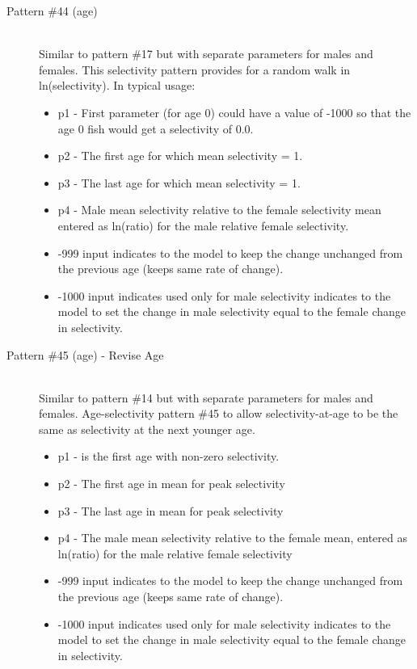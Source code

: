 \begin{description}
	\item[Pattern \#44 (age)]\hfill\\
	Similar to pattern \#17 but with separate parameters for males and females. This selectivity pattern provides for a random walk in ln(selectivity).  In typical usage:
	\begin{itemize}
		\item p1 - First parameter (for age 0) could have a value of -1000 so that the age 0 fish would get a selectivity of 0.0.
		\item p2 - The first age for which mean selectivity = 1.
		\item p3 - The last age for which mean selectivity = 1.
		\item p4 - Male mean selectivity relative to the female selectivity mean entered as ln(ratio) for the male relative female selectivity.
		\item -999 input indicates to the model to keep the change unchanged from the previous age (keeps same rate of change).
		\item -1000 input indicates used only for male selectivity indicates to the model to set the change in male selectivity equal to the female change in selectivity.
	\end{itemize}
\end{description}

\begin{description}
\item[Pattern \#45 (age) - Revise Age]\hfil\\
Similar to pattern \#14 but with separate parameters for males and females. Age-selectivity pattern \#45 to allow selectivity-at-age to be the same as selectivity at the next younger age.  
	\begin{itemize}
		\item p1 - is the first age with non-zero selectivity.
		\item p2 - The first age in mean for peak selectivity
		\item p3 - The last age in mean for peak selectivity
		\item p4 - The male mean selectivity relative to the female mean, entered as ln(ratio) for the male relative female selectivity
		\item -999 input indicates to the model to keep the change unchanged from the previous age (keeps same rate of change).
		\item -1000 input indicates used only for male selectivity indicates to the model to set the change in male selectivity equal to the female change in selectivity.
	\end{itemize}	
\end{description}


